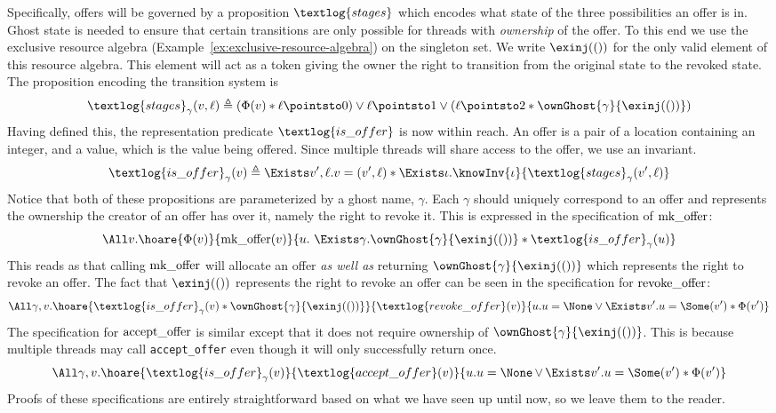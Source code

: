 Specifically, offers will be governed by a proposition
$\textlog{stages}$ which encodes what state of the three possibilities an offer is in.
Ghost state is needed to ensure that certain transitions are only possible for threads with \emph{ownership} of the offer.
To this end we use the exclusive resource algebra (Example~\ref{ex:exclusive-resource-algebra}) on the singleton set.
We write ${\exinj(())}$ for the only valid element of this resource algebra.
This element will act as a token giving the owner the right to transition from the original state to the revoked state.
The proposition encoding the transition system is
\[
  \textlog{stages}_\gamma(v, \ell) \triangleq
  (\Phi(v) \ast \ell \pointsto 0) \lor{}
  \ell \pointsto 1 \lor{}
  (\ell \pointsto 2 \ast \ownGhost{\gamma}{\exinj(())})
\]
Having defined this, the representation predicate $\textlog{is\_offer}$ is now within reach.
An offer is a pair of a location containing an integer, and a value, which is the value being offered.
Since multiple threads will share access to the offer, we use an invariant.
\[
  \textlog{is\_offer}_\gamma(v) \triangleq
  \Exists v', \ell. v = (v', \ell) \ast
  \Exists \iota. \knowInv{\iota}{\textlog{stages}_\gamma(v', \ell)}
\]
Notice that both of these propositions are parameterized by a ghost name, $\gamma$.
Each $\gamma$ should uniquely correspond to an offer and represents the ownership the creator of an offer has over it, namely the right to revoke it.
This is expressed in the specification of $\operatorname{mk\_offer}$:
\[
  \All v. \hoare{\Phi(v)}{\mkoffer(v)}{u.\ \Exists \gamma. \ownGhost{\gamma}{\exinj(())} \ast \textlog{is\_offer}_\gamma(u)}
\]
This reads as that calling $\operatorname{mk\_offer}$ will allocate an offer \emph{as well as} returning $\ownGhost{\gamma}{\exinj(())}$ which represents the right to revoke an offer.
The fact that $\exinj(())$ represents the right to revoke an offer can be seen in the specification for $\operatorname{revoke\_offer}$:
\[
  \All \gamma, v.
  \hoare{\textlog{is\_offer}_\gamma(v) \ast \ownGhost{\gamma}{\exinj(())}}
  {\textlog{revoke\_offer}(v)}
  {u . u = \None \lor{} \Exists v'. u =\Some(v') \ast \Phi(v')}
\]
The specification for $\operatorname{accept\_offer}$ is similar except that it does not require ownership of $\ownGhost{\gamma}{\exinj(())}$.
This is because multiple threads may call {\tt accept\_offer} even though it will only successfully return once.
\[
  \All \gamma, v.
  \hoare{\textlog{is\_offer}_\gamma(v)}
  {\textlog{accept\_offer}(v)}
  {u.u = \None \mathop{\lor} \Exists v'. u = \Some(v') \ast \Phi(v')}
\]
Proofs of these specifications are entirely straightforward based on what we have seen up until now, so we leave them to the reader.

